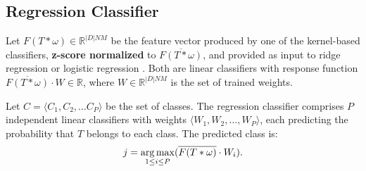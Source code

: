 \subsection{Regression Classifier}
\label{sec:regression}

Let $F(T*\omega) \in \mathbb{R}^{\left|D\right|NM}$ be the feature vector produced by one of the kernel-based classifiers, \textbf{z-score normalized} to $\overline{F(T*\omega)}$, and provided as input to ridge regression or logistic regression \cite{Rocket}. Both are linear classifiers with response function
$\overline{F(T*\omega)}\cdot W \in \mathbb{R}$, where $W \in \mathbb{R}^{\left|D\right|NM}$ is the set of trained weights.

Let $C = \langle C_1, C_2, \ldots C_P\rangle$ be the set of classes. The regression classifier comprises $P$ independent linear classifiers with weights $\langle W_1, W_2, \ldots, W_P \rangle$, each predicting the probability that $T$ belongs to each class. The predicted class is:
\begin{equation}
    j = \operatorname*{arg\,max}\limits_{1 \leq i \leq P}(\overline{F(T*\omega)}\cdot W_i).
    \label{eq:predicted_class}
\end{equation}

